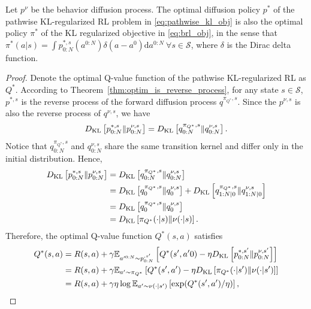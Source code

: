 \begin{theorem}\label{thm:pathwise_kl_equivalence}
    Let $p^\nu$ be the behavior diffusion process. The optimal diffusion policy $p^{*}$ of the pathwise KL-regularized RL problem in \eqref{eq:pathwise_kl_obj} is also the optimal policy $\pi^*$ of the KL regularized objective in \eqref{eq:brl_obj}, in the sense that $\pi^*(a|s)=\int p^{*, s}_{0:N}(a^{0:N})\delta(a-a^0)\mathrm{d}a^{0:N} \ \forall s\in\mathcal{S}$, where $\delta$ is the Dirac delta function. 
\end{theorem}
\begin{proof}
    Denote the optimal Q-value function of the pathwise KL-regularized RL as $Q^*$. According to Theorem~\ref{thm:optim_is_reverse_process}, for any state $s\in\mathcal{S}$, $p^{*,s}$ is the reverse process of the forward diffusion process $q^{\pi_{Q^*},s}$. Since the $p^{\nu,s}$ is also the reverse process of $q^{\nu,s}$, we have
    \begin{equation}
        D_{\rm KL}\left[p^{*,s}_{0:N}\|p^{\nu,s}_{0:N}\right]=D_{\rm KL}\left[q^{\pi_{Q^*},s}_{0:N}\|q^{\nu,s}_{0:N}\right].
    \end{equation}
    Notice that $q^{\pi_{Q^*},s}_{0:N}$ and $q^{\nu,s}_{0:N}$ share the same transition kernel and differ only in the initial distribution. Hence, 
    \begin{equation}
    \begin{aligned}
    D_{\rm KL}\left[p^{*, s}_{0:N}\|p^{\nu,s}_{0:N}\right]&=D_{\rm KL}\left[q^{\pi_{Q^*}, s}_{0:N}\|q^{\nu,s}_{0:N}\right]\\
    &=D_{\rm KL}\left[q^{\pi_{Q^*},s}_{0}\|q^{\nu,s}_{0}\right]+D_{\rm KL}\left[q^{\pi_{Q^*},s}_{1:N|0}\|q^{\nu,s}_{1:N|0}\right]\\
    &=D_{\rm KL}\left[q^{\pi_{Q^*},s}_{0}\|q^{\nu,s}_{0}\right]\\
    &=D_{\rm KL}\left[\pi_{Q^*}(\cdot|s)\|\nu(\cdot|s)\right].
    \end{aligned}
    \end{equation}
    Therefore, the optimal Q-value function $Q^*(s, a)$ satisfies
    \begin{equation}
    \begin{aligned}
            Q^*(s, a)&=R(s, a)+\gamma\mathbb{E}_{a'^{0:N}\sim p^{\*,s'}_{0:N}}\left[Q^*(s', a'0)-\eta\KL{p^{*, s'}_{0:N}}{p^{\nu,s'}_{0:N}}\right]\\
            &=R(s, a)+\gamma\mathbb{E}_{a'\sim \pi_{Q^*}}\left[Q^*(s', a')-\eta\KL{\pi_{Q^*}(\cdot|s')}{\nu(\cdot|s')}\right]\\
            &=R(s, a)+\gamma\eta\log\mathbb{E}_{a'\sim \nu(\cdot|s')}\left[\exp(Q^*(s',a')/\eta)\right],

\end{aligned}
\end{equation}
\end{proof}
